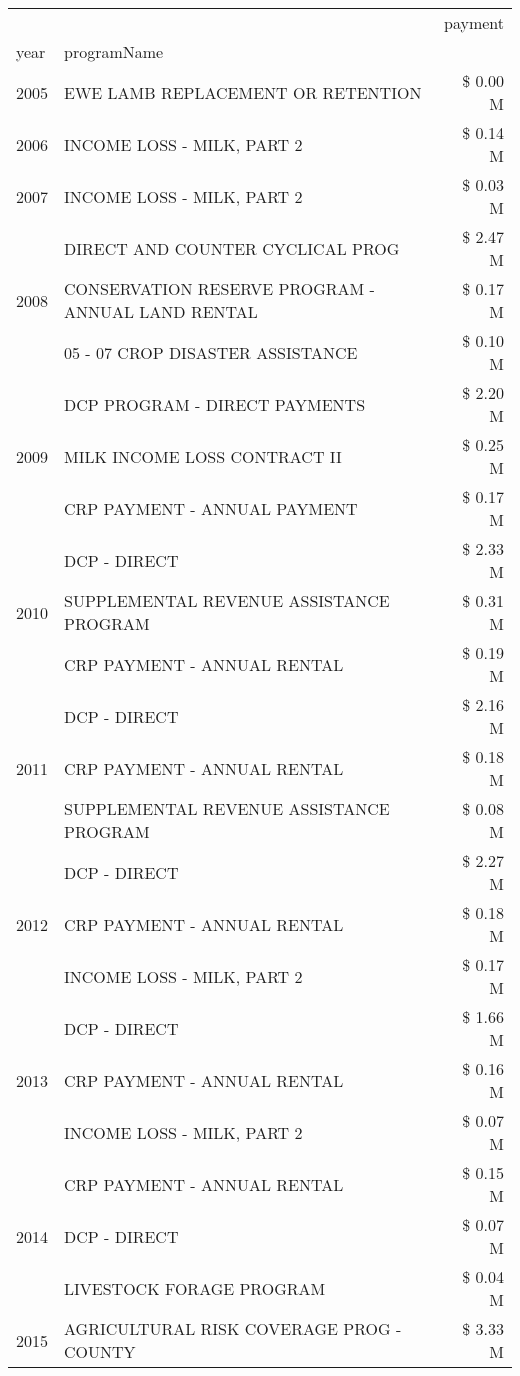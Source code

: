 \begin{tabular}{llr}
\toprule
 &  & payment \\
year & programName &  \\
\midrule
2005 & EWE LAMB REPLACEMENT OR RETENTION & \$ 0.00 M \\
\cline{1-3}
2006 & INCOME LOSS - MILK, PART 2 & \$ 0.14 M \\
\cline{1-3}
2007 & INCOME LOSS - MILK, PART 2 & \$ 0.03 M \\
\cline{1-3}
\multirow[t]{3}{*}{2008} & DIRECT AND COUNTER CYCLICAL PROG & \$ 2.47 M \\
 & CONSERVATION RESERVE PROGRAM - ANNUAL LAND RENTAL & \$ 0.17 M \\
 & 05 - 07 CROP DISASTER ASSISTANCE & \$ 0.10 M \\
\cline{1-3}
\multirow[t]{3}{*}{2009} & DCP PROGRAM - DIRECT PAYMENTS & \$ 2.20 M \\
 & MILK INCOME LOSS CONTRACT II & \$ 0.25 M \\
 & CRP PAYMENT - ANNUAL PAYMENT & \$ 0.17 M \\
\cline{1-3}
\multirow[t]{3}{*}{2010} & DCP - DIRECT & \$ 2.33 M \\
 & SUPPLEMENTAL REVENUE ASSISTANCE PROGRAM & \$ 0.31 M \\
 & CRP PAYMENT - ANNUAL RENTAL & \$ 0.19 M \\
\cline{1-3}
\multirow[t]{3}{*}{2011} & DCP - DIRECT & \$ 2.16 M \\
 & CRP PAYMENT - ANNUAL RENTAL & \$ 0.18 M \\
 & SUPPLEMENTAL REVENUE ASSISTANCE PROGRAM & \$ 0.08 M \\
\cline{1-3}
\multirow[t]{3}{*}{2012} & DCP - DIRECT & \$ 2.27 M \\
 & CRP PAYMENT - ANNUAL RENTAL & \$ 0.18 M \\
 & INCOME LOSS - MILK, PART 2 & \$ 0.17 M \\
\cline{1-3}
\multirow[t]{3}{*}{2013} & DCP - DIRECT & \$ 1.66 M \\
 & CRP PAYMENT - ANNUAL RENTAL & \$ 0.16 M \\
 & INCOME LOSS - MILK, PART 2 & \$ 0.07 M \\
\cline{1-3}
\multirow[t]{3}{*}{2014} & CRP PAYMENT - ANNUAL RENTAL & \$ 0.15 M \\
 & DCP - DIRECT & \$ 0.07 M \\
 & LIVESTOCK FORAGE PROGRAM & \$ 0.04 M \\
\cline{1-3}
\multirow[t]{3}{*}{2015} & AGRICULTURAL RISK COVERAGE PROG - COUNTY & \$ 3.33 M \\

\end{tabular}
